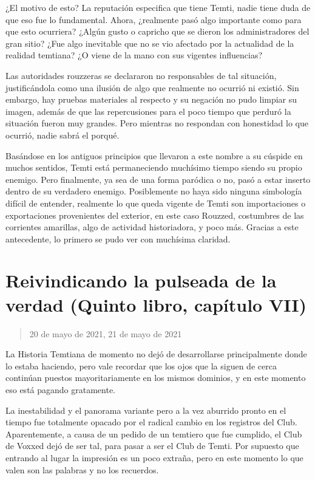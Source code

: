 \documentclass[
  spanish,
]{book}
\begin{document}
¿El motivo de esto? La reputación especifica que tiene Temti, nadie tiene duda de que eso fue lo fundamental. Ahora, ¿realmente pasó algo importante como para que esto ocurriera? ¿Algún gusto o capricho que se dieron los administradores del gran sitio? ¿Fue algo inevitable que no se vio afectado por la actualidad de la realidad temtiana? ¿O viene de la mano con sus vigentes influencias?

Las autoridades rouzzeras se declararon no responsables de tal situación, justificándola como una ilusión de algo que realmente no ocurrió ni existió. Sin embargo, hay pruebas materiales al respecto y su negación no pudo limpiar su imagen, además de que las repercusiones para el poco tiempo que perduró la situación fueron muy grandes. Pero mientras no respondan con honestidad lo que ocurrió, nadie sabrá el porqué.

Basándose en los antiguos principios que llevaron a este nombre a su cúspide en muchos sentidos, Temti está permaneciendo muchísimo tiempo siendo su propio enemigo. Pero finalmente, ya sea de una forma paródica o no, pasó a estar inserto dentro de su verdadero enemigo. Posiblemente no haya sido ninguna simbología difícil de entender, realmente lo que queda vigente de Temti son importaciones o exportaciones provenientes del exterior, en este caso Rouzzed, costumbres de las corrientes amarillas, algo de actividad historiadora, y poco más. Gracias a este antecedente, lo primero se pudo ver con muchísima claridad.

\hypertarget{reivindicando-la-pulseada-de-la-verdad-quinto-libro-capuxedtulo-vii}{%
\section{Reivindicando la pulseada de la verdad (Quinto libro, capítulo VII)}\label{reivindicando-la-pulseada-de-la-verdad-quinto-libro-capuxedtulo-vii}}

\begin{quote}
20 de mayo de 2021, 21 de mayo de 2021
\end{quote}

La Historia Temtiana de momento no dejó de desarrollarse principalmente donde lo estaba haciendo, pero vale recordar que los ojos que la siguen de cerca continúan puestos mayoritariamente en los mismos dominios, y en este momento eso está pagando gratamente.

La inestabilidad y el panorama variante pero a la vez aburrido pronto en el tiempo fue totalmente opacado por el radical cambio en los registros del Club. Aparentemente, a causa de un pedido de un temtiero que fue cumplido, el Club de Voxxed dejó de ser tal, para pasar a ser el Club de Temti. Por supuesto que entrando al lugar la impresión es un poco extraña, pero en este momento lo que valen son las palabras y no los recuerdos.
\end{document}
